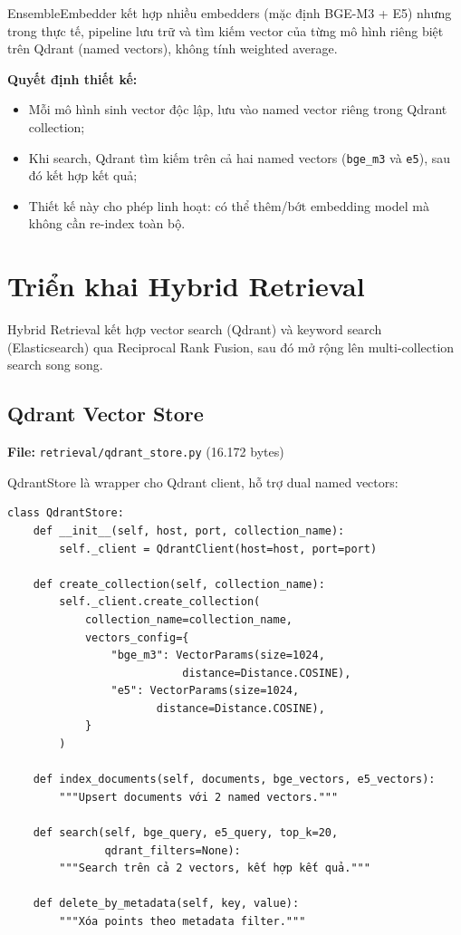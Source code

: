 \documentclass[../DoAn.tex]{subfiles}
\begin{document}
EnsembleEmbedder kết hợp nhiều embedders (mặc định BGE-M3 + E5) nhưng trong thực tế, pipeline lưu trữ và tìm kiếm vector của từng mô hình riêng biệt trên Qdrant (named vectors), không tính weighted average.

\textbf{Quyết định thiết kế:}
\begin{itemize}
    \item Mỗi mô hình sinh vector độc lập, lưu vào named vector riêng trong Qdrant collection;
    \item Khi search, Qdrant tìm kiếm trên cả hai named vectors (\texttt{bge\_m3} và \texttt{e5}), sau đó kết hợp kết quả;
    \item Thiết kế này cho phép linh hoạt: có thể thêm/bớt embedding model mà không cần re-index toàn bộ.
\end{itemize}


\section{Triển khai Hybrid Retrieval}

Hybrid Retrieval kết hợp vector search (Qdrant) và keyword search (Elasticsearch) qua Reciprocal Rank Fusion, sau đó mở rộng lên multi-collection search song song.

\subsection{Qdrant Vector Store}
\textbf{File:} \texttt{retrieval/qdrant\_store.py} (16.172 bytes)

QdrantStore là wrapper cho Qdrant client, hỗ trợ dual named vectors:
\begin{verbatim}
class QdrantStore:
    def __init__(self, host, port, collection_name):
        self._client = QdrantClient(host=host, port=port)

    def create_collection(self, collection_name):
        self._client.create_collection(
            collection_name=collection_name,
            vectors_config={
                "bge_m3": VectorParams(size=1024,
                           distance=Distance.COSINE),
                "e5": VectorParams(size=1024,
                       distance=Distance.COSINE),
            }
        )

    def index_documents(self, documents, bge_vectors, e5_vectors):
        """Upsert documents với 2 named vectors."""

    def search(self, bge_query, e5_query, top_k=20,
               qdrant_filters=None):
        """Search trên cả 2 vectors, kết hợp kết quả."""

    def delete_by_metadata(self, key, value):
        """Xóa points theo metadata filter."""
\end{verbatim}
\end{document}
